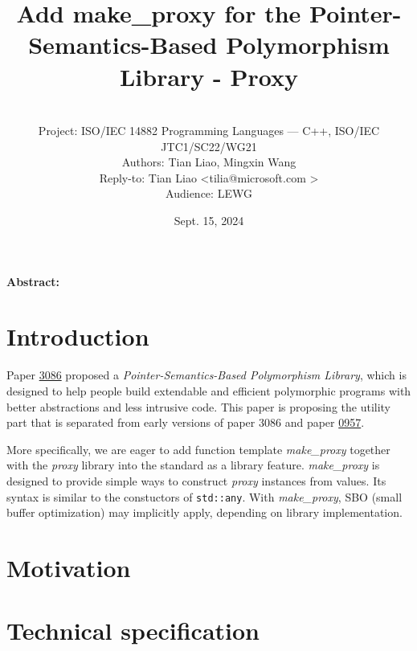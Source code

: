 \documentclass[10pt, a4paper, oneside]{article}
\title{Add make\_proxy for the Pointer-Semantics-Based
Polymorphism Library - Proxy}
\date{Sept. 15, 2024}
\author{%
\ \\
Project: ISO/IEC 14882 Programming Languages — C++, ISO/IEC JTC1/SC22/WG21\\
Authors: Tian Liao, Mingxin Wang\\
Reply-to: Tian Liao \textless tilia@microsoft.com \textgreater \\
Audience: LEWG\\
}
\makeatletter
\renewcommand{\maketitle}{\bgroup\setlength{\parindent}{0pt}
\begin{flushleft}
  \textbf{\huge \@title}

  \@author
\end{flushleft}\egroup
}
\makeatother
\begin{document}
\maketitle

\textbf{Abstract:} \lipsum[1]

\section{Introduction}

Paper \href{https://wg21.link/p3086}{3086} proposed a \textit{Pointer-Semantics-Based Polymorphism Library},
which is designed to help people build extendable and efficient polymorphic programs with better abstractions and less intrusive code.
This paper is proposing the utility part that is separated from early versions of paper 3086 and paper \href{https://wg21.link/p0957}{0957}.

More specifically, we are eager to add function template \textit{make\_proxy} together with the \textit{proxy} library into the standard as a library feature.
\textit{make\_proxy} is designed to provide simple ways to construct \textit{proxy} instances from values. Its syntax is similar to the constuctors of \verb|std::any|.
With \textit{make\_proxy}, SBO (small buffer optimization) may implicitly apply, depending on library implementation.

\section{Motivation}
\lipsum[1]

\section{Technical specification}
\lipsum[1]
\end{document}
